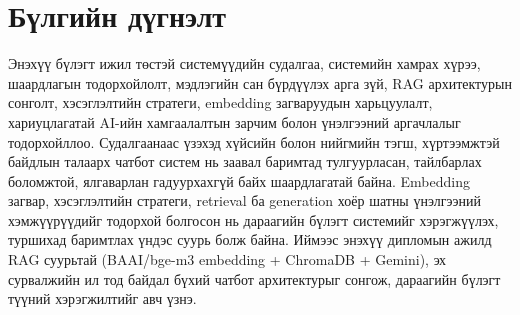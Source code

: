 
\section{Бүлгийн дүгнэлт}

Энэхүү бүлэгт ижил төстэй системүүдийн судалгаа, системийн хамрах хүрээ, шаардлагын тодорхойлолт, мэдлэгийн сан бүрдүүлэх арга зүй, RAG архитектурын сонголт, хэсэглэлтийн стратеги, embedding загваруудын харьцуулалт, хариуцлагатай AI-ийн хамгаалалтын зарчим болон үнэлгээний аргачлалыг тодорхойллоо. Судалгаанаас үзэхэд хүйсийн болон нийгмийн тэгш, хүртээмжтэй байдлын талаарх чатбот систем нь заавал баримтад тулгуурласан, тайлбарлах боломжтой, ялгаварлан гадуурхахгүй байх шаардлагатай байна. Embedding загвар, хэсэглэлтийн стратеги, retrieval ба generation хоёр шатны үнэлгээний хэмжүүрүүдийг тодорхой болгосон нь дараагийн бүлэгт системийг хэрэгжүүлэх, туршихад баримтлах үндэс суурь болж байна. Иймээс энэхүү дипломын ажилд RAG суурьтай (BAAI/bge-m3 embedding + ChromaDB + Gemini), эх сурвалжийн ил тод байдал бүхий чатбот архитектурыг сонгож, дараагийн бүлэгт түүний хэрэгжилтийг авч үзнэ.


